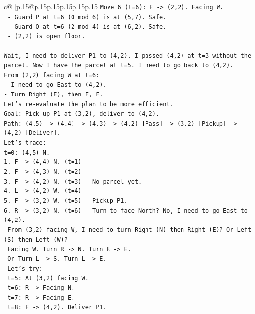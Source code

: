 \documentclass{article}
\begin{document}
{\begin{supertabular}{c@{$\;$}|p{.15\linewidth}@{}p{.15\linewidth}p{.15\linewidth}p{.15\linewidth}p{.15\linewidth}p{.15\linewidth}}
{{{\texttt{Move 6 (t=6): F {-}> (2,2). Facing W.} \\
\texttt{  {-} Guard P at t=6 (0 mod 6) is at (5,7). Safe.} \\
\texttt{  {-} Guard Q at t=6 (2 mod 4) is at (6,2). Safe.} \\
\texttt{  {-} (2,2) is open floor.} \\
\\ 
\texttt{Wait, I need to deliver P1 to (4,2). I passed (4,2) at t=3 without the parcel. Now I have the parcel at t=5. I need to go back to (4,2).} \\
\texttt{From (2,2) facing W at t=6:} \\
\texttt{{-} I need to go East to (4,2).} \\
\texttt{{-} Turn Right (E), then F, F.} \\
\texttt{Let's re{-}evaluate the plan to be more efficient.} \\
\texttt{Goal: Pick up P1 at (3,2), deliver to (4,2).} \\
\texttt{Path: (4,5) {-}> (4,4) {-}> (4,3) {-}> (4,2) {[}Pass{]} {-}> (3,2) {[}Pickup{]} {-}> (4,2) {[}Deliver{]}.} \\
\texttt{Let's trace:} \\
\texttt{t=0: (4,5) N.} \\
\texttt{1. F {-}> (4,4) N. (t=1)} \\
\texttt{2. F {-}> (4,3) N. (t=2)} \\
\texttt{3. F {-}> (4,2) N. (t=3) {-} No parcel yet.} \\
\texttt{4. L {-}> (4,2) W. (t=4)} \\
\texttt{5. F {-}> (3,2) W. (t=5) {-} Pickup P1.} \\
\texttt{6. R {-}> (3,2) N. (t=6) {-} Turn to face North? No, I need to go East to (4,2).} \\
\texttt{   From (3,2) facing W, I need to turn Right (N) then Right (E)? Or Left (S) then Left (W)?} \\
\texttt{   Facing W. Turn R {-}> N. Turn R {-}> E.} \\
\texttt{   Or Turn L {-}> S. Turn L {-}> E.} \\
\texttt{   Let's try:} \\
\texttt{   t=5: At (3,2) facing W.} \\
\texttt{   t=6: R {-}> Facing N.} \\
\texttt{   t=7: R {-}> Facing E.} \\
\texttt{   t=8: F {-}> (4,2). Deliver P1.} \\
}}}
\end{supertabular}}
\end{document}
